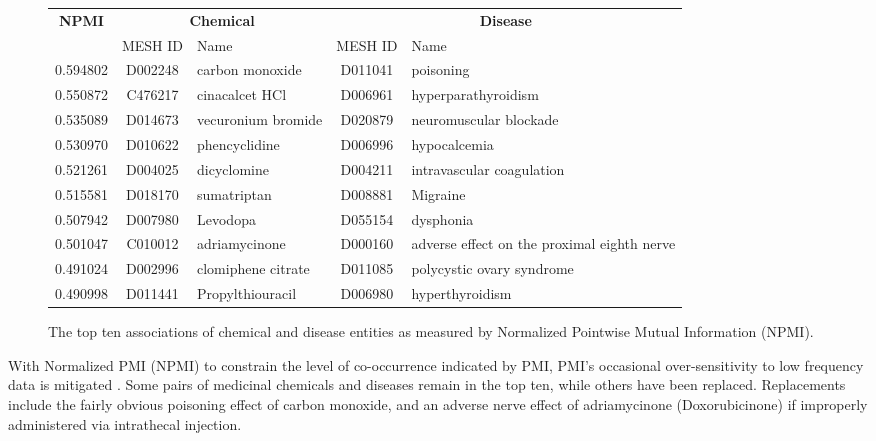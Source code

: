 \documentclass[10pt, oneside]{article}
\begin{document}
\begin{figure}[h]
\begin{center}
\fontsize{9}{11}\selectfont
\begin{tabular}{|*{2}{c|}p{4.5cm}|c|p{4.5cm}|}\hline
 \multirow{2}{*}{\textbf{NPMI}} & \multicolumn{2}{c|}{\textbf{Chemical}} & \multicolumn{2}{c|}{\textbf{Disease}} \\ \cline{2-5}
  & MESH ID   & Name                      & MESH ID   & Name                         \\ \hline 
 0.594802 & D002248   & carbon monoxide    & D011041   & poisoning                                   \\ \hline
 0.550872 & C476217   & cinacalcet HCl     & D006961   & hyperparathyroidism                         \\ \hline
 0.535089 & D014673   & vecuronium bromide & D020879   & neuromuscular blockade                      \\ \hline
 0.530970 & D010622   & phencyclidine      & D006996   & hypocalcemia                                \\ \hline
 0.521261 & D004025   & dicyclomine        & D004211   & intravascular coagulation                   \\ \hline
 0.515581 & D018170   & sumatriptan        & D008881   & Migraine                                    \\ \hline
 0.507942 & D007980   & Levodopa           & D055154   & dysphonia                                   \\ \hline
 0.501047 & C010012   & adriamycinone      & D000160   & adverse effect on the proximal eighth nerve \\ \hline
 0.491024 & D002996   & clomiphene citrate & D011085   & polycystic ovary syndrome                   \\ \hline
 0.490998 & D011441   & Propylthiouracil   & D006980   & hyperthyroidism                             \\ \hline
\end{tabular}
\caption{\label{fig:npmi} The top ten associations of chemical and disease entities as measured by Normalized Pointwise Mutual Information (NPMI).}
\end{center}
\end{figure}

With Normalized PMI (NPMI) to constrain the level of co-occurrence indicated by PMI, PMI's occasional over-sensitivity to low frequency data is mitigated \cite{bouma2009normalized}. Some pairs of medicinal chemicals and diseases remain in the top ten, while others have been replaced. Replacements include the fairly obvious poisoning effect of carbon monoxide, and an adverse nerve effect of adriamycinone (Doxorubicinone) \cite[ch. 55]{kompoliti2007drug} if improperly administered via intrathecal injection.
\end{document}

